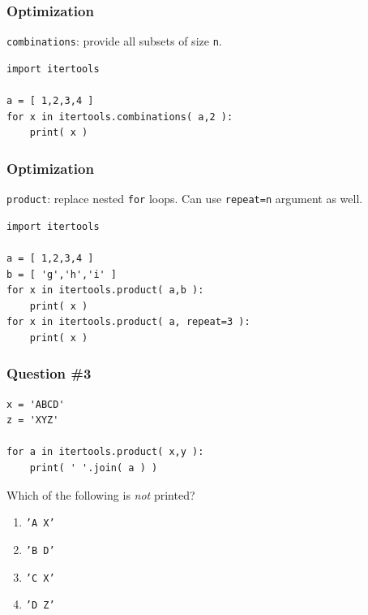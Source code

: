 \documentclass[11pt]{beamer}
\begin{document}
\begin{frame}[fragile]
  \frametitle{Optimization}
  \Enlarge

  \begin{enumerate}
  \myitem  \texttt{combinations}:  provide all subsets of size \texttt{n}.
  \end{enumerate}
  \begin{Verbatim}
import itertools

a = [ 1,2,3,4 ]
for x in itertools.combinations( a,2 ):
    print( x )
  \end{Verbatim}
\end{frame}

\begin{frame}[fragile]
  \frametitle{Optimization}
  \Enlarge

  \begin{enumerate}
  \myitem  \texttt{product}:  replace nested \texttt{for} loops.
  \myitem  Can use \texttt{repeat=n} argument as well.
  \end{enumerate}
  \begin{Verbatim}
import itertools

a = [ 1,2,3,4 ]
b = [ 'g','h','i' ]
for x in itertools.product( a,b ):
    print( x )
for x in itertools.product( a, repeat=3 ):
    print( x )
  \end{Verbatim}
\end{frame}

\begin{frame}[fragile]
  \frametitle{Question \#3}

  \begin{Verbatim}
x = 'ABCD'
z = 'XYZ'

for a in itertools.product( x,y ):
    print( ' '.join( a ) )
  \end{Verbatim}

Which of the following is \emph{not} printed?

  \begin{enumerate}[label=\Alph*]
    \item  \texttt{'A X'}
    \item  \texttt{'B D'}
    \item  \texttt{'C X'}
    \item  \texttt{'D Z'}
  \end{enumerate}
\end{frame}
\end{document}
